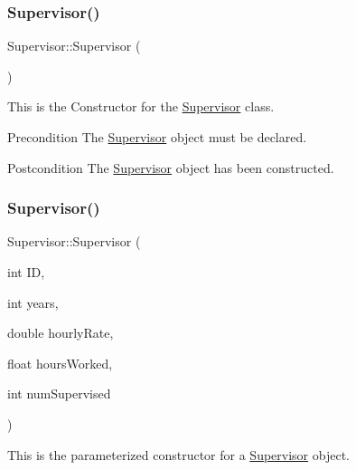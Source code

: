 \subsubsection{\texorpdfstring{Supervisor()}{Supervisor()}\hspace{0.1cm}{\footnotesize\ttfamily [1/2]}}
{\footnotesize\ttfamily Supervisor\+::\+Supervisor (\begin{DoxyParamCaption}{ }\end{DoxyParamCaption})}

This is the Constructor for the \hyperlink{classSupervisor}{Supervisor} class.

\begin{DoxyPrecond}{Precondition}
The \hyperlink{classSupervisor}{Supervisor} object must be declared. 
\end{DoxyPrecond}
\begin{DoxyPostcond}{Postcondition}
The \hyperlink{classSupervisor}{Supervisor} object has been constructed. 
\end{DoxyPostcond}
\mbox{\label{classSupervisor_a02d9245744652deb20e9408001d6ed3b}} 
\subsubsection{\texorpdfstring{Supervisor()}{Supervisor()}\hspace{0.1cm}{\footnotesize\ttfamily [2/2]}}
{\footnotesize\ttfamily Supervisor\+::\+Supervisor (\begin{DoxyParamCaption}\item[{int}]{ID,  }\item[{int}]{years,  }\item[{double}]{hourly\+Rate,  }\item[{float}]{hours\+Worked,  }\item[{int}]{num\+Supervised }\end{DoxyParamCaption})}

This is the parameterized constructor for a \hyperlink{classSupervisor}{Supervisor} object.


